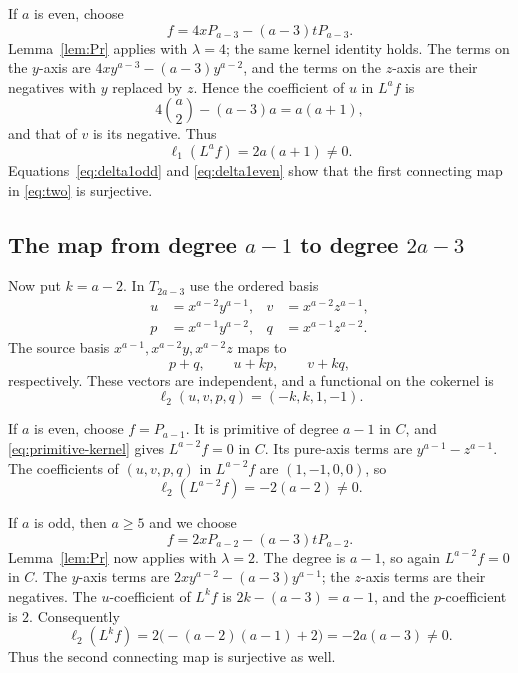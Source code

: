 \documentclass[11pt]{amsart}
\theoremstyle{definition}
\begin{document}
If $a$ is even, choose
\[
 f=4xP_{a-3}-(a-3)tP_{a-3}.
\]
Lemma~\ref{lem:Pr} applies with $\lambda=4$; the same kernel identity
holds. The terms on the $y$-axis are
$4xy^{a-3}-(a-3)y^{a-2}$, and the terms on the $z$-axis are their
negatives with $y$ replaced by $z$. Hence the coefficient of $u$ in
$L^af$ is
\[
 4\binom a2-(a-3)a=a(a+1),
\]
and that of $v$ is its negative. Thus
\begin{equation}\label{eq:delta1even}
 \ell_1(L^af)=2a(a+1)\ne0.
\end{equation}
Equations~\eqref{eq:delta1odd} and \eqref{eq:delta1even} show that
the first connecting map in \eqref{eq:two} is surjective.

\subsection{\texorpdfstring{The map from degree $a-1$ to degree $2a-3$}{The second connecting map}}

Now put $k=a-2$. In $T_{2a-3}$ use the ordered basis
\begin{align*}
 u&=x^{a-2}y^{a-1},&v&=x^{a-2}z^{a-1},\\
 p&=x^{a-1}y^{a-2},&q&=x^{a-1}z^{a-2}.
\end{align*}
The source basis $x^{a-1},x^{a-2}y,x^{a-2}z$ maps to
\[
 p+q,\qquad u+kp,\qquad v+kq,
\]
respectively. These vectors are independent, and a functional on the
cokernel is
\begin{equation}\label{eq:ell2}
 \ell_2(u,v,p,q)=(-k,k,1,-1).
\end{equation}

If $a$ is even, choose $f=P_{a-1}$. It is primitive of degree $a-1$
in $C$, and \eqref{eq:primitive-kernel} gives $L^{a-2}f=0$ in $C$.
Its pure-axis terms are $y^{a-1}-z^{a-1}$. The coefficients of
$(u,v,p,q)$ in $L^{a-2}f$ are $(1,-1,0,0)$, so
\begin{equation}\label{eq:delta2even}
 \ell_2(L^{a-2}f)=-2(a-2)\ne0.
\end{equation}

If $a$ is odd, then $a\ge5$ and we choose
\[
 f=2xP_{a-2}-(a-3)tP_{a-2}.
\]
Lemma~\ref{lem:Pr} now applies with $\lambda=2$.
The degree is $a-1$, so again $L^{a-2}f=0$ in $C$.
The $y$-axis terms are
$2xy^{a-2}-(a-3)y^{a-1}$; the $z$-axis terms are their negatives.
The $u$-coefficient of $L^kf$ is $2k-(a-3)=a-1$, and the
$p$-coefficient is $2$. Consequently
\begin{equation}\label{eq:delta2odd}
 \ell_2(L^kf)=2\bigl(-(a-2)(a-1)+2\bigr)=-2a(a-3)\ne0.
\end{equation}
Thus the second connecting map is surjective as well.
\end{document}
